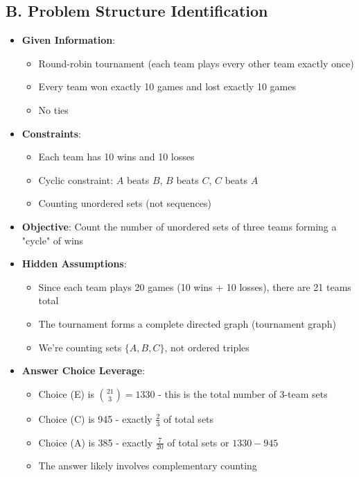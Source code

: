 \documentclass[]{article}
\begin{document}
\begin{problemconfigbox}
\subsection*{B. Problem Structure Identification}
\begin{itemize}[leftmargin=*]
    \item \textbf{Given Information}: 
    \begin{itemize}
        \item Round-robin tournament (each team plays every other team exactly once)
        \item Every team won exactly 10 games and lost exactly 10 games
        \item No ties
    \end{itemize}
    \item \textbf{Constraints}: 
    \begin{itemize}
        \item Each team has 10 wins and 10 losses
        \item Cyclic constraint: $A$ beats $B$, $B$ beats $C$, $C$ beats $A$
        \item Counting unordered sets (not sequences)
    \end{itemize}
    \item \textbf{Objective}: Count the number of unordered sets of three teams forming a "cycle" of wins
    \item \textbf{Hidden Assumptions}: 
    \begin{itemize}
        \item Since each team plays 20 games (10 wins + 10 losses), there are 21 teams total
        \item The tournament forms a complete directed graph (tournament graph)
        \item We're counting sets $\{A, B, C\}$, not ordered triples
    \end{itemize}
    \item \textbf{Answer Choice Leverage}: 
    \begin{itemize}
        \item Choice (E) is $\binom{21}{3} = 1330$ - this is the total number of 3-team sets
        \item Choice (C) is 945 - exactly $\frac{2}{3}$ of total sets
        \item Choice (A) is 385 - exactly $\frac{7}{20}$ of total sets or $1330 - 945$
        \item The answer likely involves complementary counting
    \end{itemize}
\end{itemize}


\end{problemconfigbox}
\end{document}
